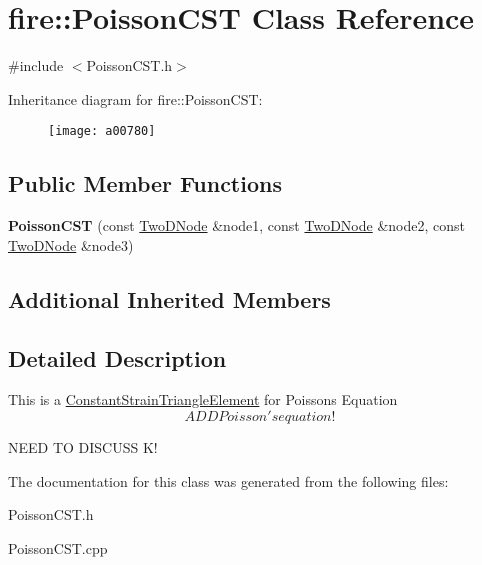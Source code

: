 \hypertarget{a00780}{}\section{fire\+:\+:Poisson\+C\+ST Class Reference}
\label{a00780}


{\ttfamily \#include $<$Poisson\+C\+S\+T.\+h$>$}

Inheritance diagram for fire\+:\+:Poisson\+C\+ST\+:\begin{figure}[H]
\begin{center}
\leavevmode
\texttt{[image: a00780]}
\end{center}
\end{figure}
\subsection*{Public Member Functions}
\begin{DoxyCompactItemize}
\item 
\mbox{\label{a00780_ab45e61d417f5bbf0803d884bfb2db07f}} 
{\bfseries Poisson\+C\+ST} (const \hyperlink{a00189_a92dafcc05a788e1065a5792b67f0f70e}{Two\+D\+Node} \&node1, const \hyperlink{a00189_a92dafcc05a788e1065a5792b67f0f70e}{Two\+D\+Node} \&node2, const \hyperlink{a00189_a92dafcc05a788e1065a5792b67f0f70e}{Two\+D\+Node} \&node3)
\end{DoxyCompactItemize}
\subsection*{Additional Inherited Members}


\subsection{Detailed Description}
This is a \hyperlink{a00764}{Constant\+Strain\+Triangle\+Element} for Poisson\textquotesingle{}s Equation \[ ADD Poisson's equation! \]

N\+E\+ED TO D\+I\+S\+C\+U\+SS K! 

The documentation for this class was generated from the following files\+:\begin{DoxyCompactItemize}
\item 
Poisson\+C\+S\+T.\+h\item 
Poisson\+C\+S\+T.\+cpp\end{DoxyCompactItemize}
